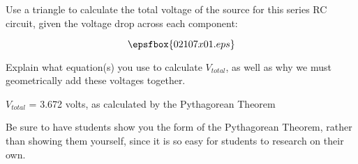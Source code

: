 

Use a triangle to calculate the total voltage of the source for this series RC circuit, given the voltage drop across each component:

$$\epsfbox{02107x01.eps}$$

Explain what equation(s) you use to calculate $V_{total}$, as well as why we must geometrically add these voltages together.







$V_{total}$ = 3.672 volts, as calculated by the Pythagorean Theorem







Be sure to have students show you the form of the Pythagorean Theorem, rather than showing them yourself, since it is so easy for students to research on their own.




